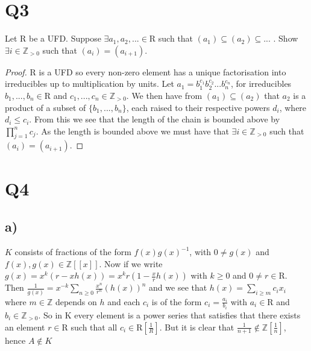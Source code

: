 \documentclass{article}
\theoremstyle{definition}
\begin{document}
\section*{Q3}
Let R be a UFD. Suppose $\exists a_1,a_2,...\in$R such that $(a_1)\subseteq(a_2)\subseteq...$ . Show $\exists i\in\mathbb{Z}_{>0}$ such that $(a_i)=(a_{i+1})$.
\begin{proof}
R is a UFD so every non-zero element has a unique factorisation into irreducibles up to multiplication by units. Let $a_1=b_1^{c_1}b_2^{c_2}...b_n^{c_n}$, for irreducibles $b_1,...,b_n\in$R and $c_1,...,c_n\in\mathbb{Z}_{>0}$. We then have from $(a_1)\subseteq(a_2)$ that $a_2$ is a product of a subset of $\{b_1,...,b_n\}$, each raised to their respective powers $d_i$, where $d_i\leq c_i$. From this we see that the length of the chain is bounded above by $\prod_{j=1}^{n}c_j$. As the length is bounded above we must have that $\exists i\in\mathbb{Z}_{>0}$ such that $(a_i)=(a_{i+1})$.
\end{proof}
\section*{Q4}
\subsection*{a)}
$K$ consists of fractions of the form $f(x)g(x)^{-1}$, with $0\neq g(x)$ and $f(x),g(x)\in\mathbb{Z}[[x]]$. Now if we write $g(x)=x^k(r-xh(x))=x^kr(1-\frac{x}{r}h(x))$ with $k\geq0$ and $0\neq r\in$R. Then $\frac{1}{g(x)}=x^{-k}\sum_{n\geq0}\frac{x^n}{r^n}(h(x))^n$ and we see that $h(x)=\sum_{i\geq m}c_ix_i$ where $m\in\mathbb{Z}$ depends on $h$ and each $c_i$ is of the form $c_i=\frac{a_i}{b_i}$ with $a_i\in$R and $b_i\in\mathbb{Z}_{>0}$. So in K every element is a power series that satisfies that there exists an element $r\in$R such that all $c_i\in$R$\left[\frac{1}{R}\right]$. But it is clear that $\frac{1}{n+1}\notin\mathbb{Z}\left[\frac{1}{n}\right]$, hence $A\notin K$
\end{document}
